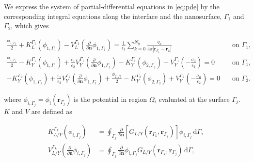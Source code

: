 


We express the system of partial-differential equations in  \eqref{eq:pde} by the corresponding integral equations along the interface and the nanosurface, $\Gamma_1$ and $\Gamma_2$, which gives

\begin{widetext}
\begin{align} \label{eq:integral_eq}
\frac{\phi_{1,\Gamma_1}}{2}+ K_{L}^{\Gamma_1}(\phi_{1,\Gamma_1}) -  V_{L}^{\Gamma_1} \left(\frac{\partial}{\partial \mathbf{n}}\phi_{1,\Gamma_1} \right)  =  
\frac{1}{\epsilon_1} \sum_{k=0}^{N_q} \frac{q_k}{4\pi|\mathbf{r}_{\Gamma_1} - \mathbf{r}_k|} &  \quad \text{on $\Gamma_1$,} \nonumber \\ 
\frac{\phi_{1,\Gamma_1}}{2} - K_{Y}^{\Gamma_1}(\phi_{1,\Gamma_1}) +  \frac{\epsilon_1}{\epsilon_2} V_{Y}^{\Gamma_1} \left( \frac{\partial}{\partial \mathbf{n}} \phi_{1,\Gamma_1} \right) -  
K_{Y}^{\Gamma_1}(\phi_{2,\Gamma_2})  + V_{Y}^{\Gamma_1} \left( -\frac{\sigma_0}{\epsilon_2} \right)  = 0& \quad \text{on $\Gamma_1$,} \nonumber \\ 
- K_{Y}^{\Gamma_2}(\phi_{1,\Gamma_1}) + \frac{\epsilon_1}{\epsilon_2} V_{Y}^{\Gamma_2}  \left( \frac{\partial}{\partial \mathbf{n}} \phi_{1,\Gamma_1} \right) + \frac{\phi_{2,\Gamma_2}}{2} - 
K_{Y}^{\Gamma_2}(\phi_{2,\Gamma_2}) +  V_{Y}^{\Gamma_2} \left( -\frac{\sigma_0}{\epsilon_2} \right)  = 0& \quad \text{on $\Gamma_2$.}
\end{align}
\end{widetext}


\noindent where $\phi_{i,\Gamma_j} = \phi_i(\mathbf{r}_{\Gamma_j})$ is the potential in region $\Omega_i$ evaluated at the surface $\Gamma_j$. $K$ and $V$ are defined as

%
\begin{align} \label{eq:layers}
K_{L/Y}^{\Gamma_k}(\phi_{i,\Gamma_j}) &= \oint_{\Gamma_j} \frac{\partial}{\partial \mathbf{n}} \left[ G_{L/Y}(\mathbf{r}_{\Gamma_k},\mathbf{r}_{\Gamma_j}) \right]\phi_{i,\Gamma_j} \, \mathrm{d} \Gamma, \nonumber \\
V_{L/Y}^{\Gamma_k} \left( \frac{\partial}{\partial \mathbf{n}} \phi_{i,\Gamma_j} \right) &= \oint_{\Gamma_j} \frac{\partial}{\partial \mathbf{n}} \phi_{i,\Gamma_j} G_{L/Y}(\mathbf{r}_{\Gamma_k},\mathbf{r}_{\Gamma_j})  \, \mathrm{d} \Gamma,
\end{align}

